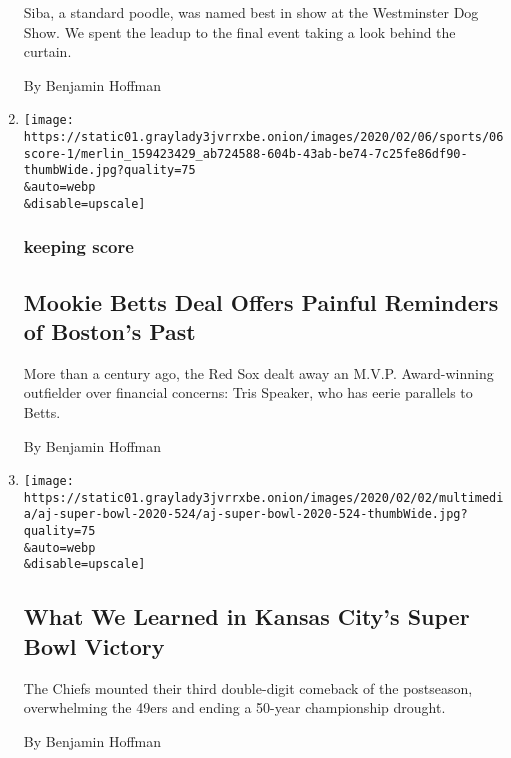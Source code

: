 \begin{enumerate}
  Siba, a standard poodle, was named best in show at the Westminster Dog
  Show. We spent the leadup to the final event taking a look behind the
  curtain.

  By Benjamin Hoffman
\item
  \href{/2020/02/06/sports/baseball/mookie-betts.html}{}

  \texttt{[image: https://static01.graylady3jvrrxbe.onion/images/2020/02/06/sports/06score-1/merlin\_159423429\_ab724588-604b-43ab-be74-7c25fe86df90-thumbWide.jpg?quality=75\\\&auto=webp\\\&disable=upscale]}

  \hypertarget{keeping-score-1}{%
  \subsubsection{keeping score}\label{keeping-score-1}}

  \hypertarget{mookie-betts-deal-offers-painful-reminders-of-bostons-past}{%
  \subsection{Mookie Betts Deal Offers Painful Reminders of Boston's
  Past}\label{mookie-betts-deal-offers-painful-reminders-of-bostons-past}}

  More than a century ago, the Red Sox dealt away an M.V.P.
  Award-winning outfielder over financial concerns: Tris Speaker, who
  has eerie parallels to Betts.

  By Benjamin Hoffman
\item
  \href{/2020/02/03/sports/football/chiefs-super-bowl-champions.html}{}

  \texttt{[image: https://static01.graylady3jvrrxbe.onion/images/2020/02/02/multimedia/aj-super-bowl-2020-524/aj-super-bowl-2020-524-thumbWide.jpg?quality=75\\\&auto=webp\\\&disable=upscale]}

  \hypertarget{what-we-learned-in-kansas-citys-super-bowl-victory}{%
  \subsection{What We Learned in Kansas City's Super Bowl
  Victory}\label{what-we-learned-in-kansas-citys-super-bowl-victory}}

  The Chiefs mounted their third double-digit comeback of the
  postseason, overwhelming the 49ers and ending a 50-year championship
  drought.

  By Benjamin Hoffman
\end{enumerate}

